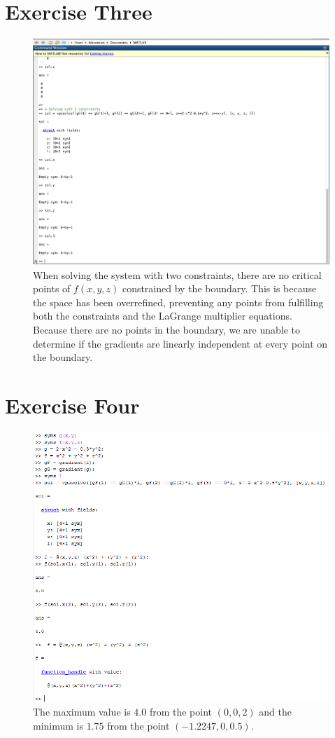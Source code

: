 \documentclass[11pt]{article}
\begin{document}
\section*{Exercise Three}
\begin{figure}[H]
	\centering
	\includegraphics[width=\textwidth]{Prob3.png}
	\caption*{When solving the system with two constraints, there are no critical points of $f(x, y, z)$ constrained by the boundary. This is because the space has been overrefined, preventing any points from fulfilling both the constraints and the LaGrange multiplier equations. Because there are no points in the boundary, we are unable to determine if the gradients are linearly independent at every point on the boundary.}
\end{figure}

\section*{Exercise Four}
\begin{figure}[H]
	\centering
	\includegraphics[width=\textwidth]{Four.PNG}
	\caption*{The maximum value is $4.0$ from the point $(0, 0, 2)$ and the minimum is $1.75$ from the point $(-1.2247, 0, 0.5)$.}
\end{figure}
\end{document}
